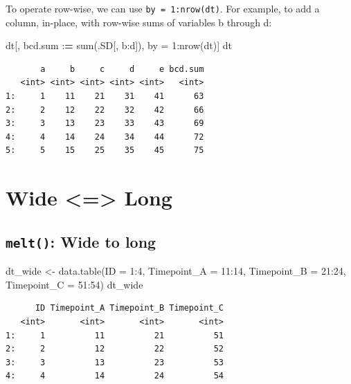 \documentclass[
]{book}
\newenvironment{Shaded}{\begin{snugshade}}{\end{snugshade}}
\newcommand{\AttributeTok}[1]{\textcolor[rgb]{0.77,0.63,0.00}{#1}}
\newcommand{\DecValTok}[1]{\textcolor[rgb]{0.00,0.00,0.81}{#1}}
\newcommand{\ErrorTok}[1]{\textcolor[rgb]{0.64,0.00,0.00}{\textbf{#1}}}
\newcommand{\FunctionTok}[1]{\textcolor[rgb]{0.00,0.00,0.00}{#1}}
\newcommand{\NormalTok}[1]{#1}
\newcommand{\OtherTok}[1]{\textcolor[rgb]{0.56,0.35,0.01}{#1}}
\newcommand{\SpecialCharTok}[1]{\textcolor[rgb]{0.00,0.00,0.00}{#1}}
\begin{document}
To operate row-wise, we can use \texttt{by\ =\ 1:nrow(dt)}.
For example, to add a column, in-place, with row-wise sums of variables b through d:

\begin{Shaded}
\begin{Highlighting}[]
\NormalTok{dt[, bcd.sum }\SpecialCharTok{:}\ErrorTok{=} \FunctionTok{sum}\NormalTok{(.SD[, b}\SpecialCharTok{:}\NormalTok{d]), by }\OtherTok{=} \DecValTok{1}\SpecialCharTok{:}\FunctionTok{nrow}\NormalTok{(dt)]}
\NormalTok{dt}
\end{Highlighting}
\end{Shaded}

\begin{verbatim}
       a     b     c     d     e bcd.sum
   <int> <int> <int> <int> <int>   <int>
1:     1    11    21    31    41      63
2:     2    12    22    32    42      66
3:     3    13    23    33    43      69
4:     4    14    24    34    44      72
5:     5    15    25    35    45      75
\end{verbatim}

\hypertarget{wide-long}{%
\section{Wide \textless=\textgreater{} Long}\label{wide-long}}

\hypertarget{melt-wide-to-long}{%
\subsection{\texorpdfstring{\texttt{melt()}: Wide to long}{melt(): Wide to long}}\label{melt-wide-to-long}}

\begin{Shaded}
\begin{Highlighting}[]
\NormalTok{dt\_wide }\OtherTok{\textless{}{-}} \FunctionTok{data.table}\NormalTok{(}\AttributeTok{ID =} \DecValTok{1}\SpecialCharTok{:}\DecValTok{4}\NormalTok{, }\AttributeTok{Timepoint\_A =} \DecValTok{11}\SpecialCharTok{:}\DecValTok{14}\NormalTok{,}
                      \AttributeTok{Timepoint\_B =} \DecValTok{21}\SpecialCharTok{:}\DecValTok{24}\NormalTok{, }\AttributeTok{Timepoint\_C =} \DecValTok{51}\SpecialCharTok{:}\DecValTok{54}\NormalTok{)}
\NormalTok{dt\_wide}
\end{Highlighting}
\end{Shaded}

\begin{verbatim}
      ID Timepoint_A Timepoint_B Timepoint_C
   <int>       <int>       <int>       <int>
1:     1          11          21          51
2:     2          12          22          52
3:     3          13          23          53
4:     4          14          24          54
\end{verbatim}
\end{document}
